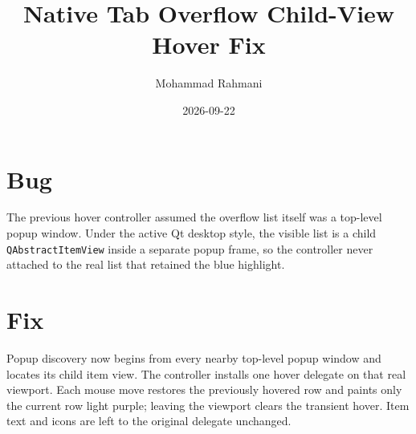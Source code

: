 \documentclass[a4paper]{article}
\title{Native Tab Overflow Child-View Hover Fix}
\date{2026-09-22}
\author{Mohammad Rahmani}
\begin{document}
   \maketitle

   \begin{preview}
      \section{Bug}
      The previous hover controller assumed the overflow list itself was a
      top-level popup window.  Under the active Qt desktop style, the visible
      list is a child \texttt{QAbstractItemView} inside a separate popup frame,
      so the controller never attached to the real list that retained the blue
      highlight.

      \section{Fix}
      Popup discovery now begins from every nearby top-level popup window and
      locates its child item view.  The controller installs one hover delegate
      on that real viewport.  Each mouse move restores the previously hovered
      row and paints only the current row light purple; leaving the viewport
      clears the transient hover.  Item text and icons are left to the original
      delegate unchanged.
   \end{preview}

   
   
\end{document}
